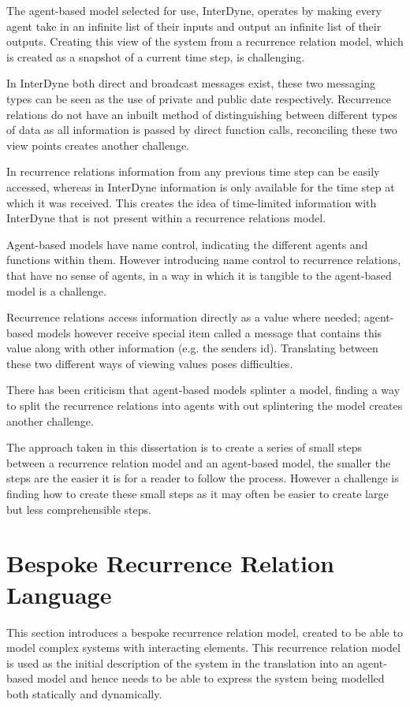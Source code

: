 \documentclass{article}
\begin{document}
The agent-based model selected for use, InterDyne, operates by making every agent take in an infinite list of their inputs and output an infinite list of their outputs. Creating this view of the system from a recurrence relation model, which is created as a snapshot of a current time step, is challenging. 

In InterDyne both direct and broadcast messages exist, these two messaging types can be seen as the use of private and public date respectively. Recurrence relations do not have an inbuilt method of distinguishing between different types of data as all information is passed by direct function calls, reconciling these two view points creates another challenge. 

In recurrence relations information from any previous time step can be easily accessed, whereas in InterDyne information is only available for the time step at which it was received. This creates the idea of time-limited information with InterDyne that is not present within a recurrence relations model.   

Agent-based models have name control, indicating the different agents and functions within them. However introducing name control to  recurrence relations, that have no sense of agents, in a way in which it is tangible to the agent-based model is a challenge. 

Recurrence relations access information directly as a value where needed; agent-based models however receive special item called a message that contains this value along with other information (e.g. the senders id). Translating between these two different ways of viewing values poses difficulties.  

There has been criticism that agent-based models splinter a model, finding a way to split the recurrence relations into agents with out splintering the model creates another challenge. 

The approach taken in this dissertation is to create a series of small steps between a recurrence relation model and an agent-based model, the smaller the steps are the easier it is for a reader to follow the process. However a challenge is finding how to create these small steps as it may often be easier to create large but less comprehensible steps.   








\newpage
\section{Bespoke Recurrence Relation Language} \label{beskoperecurrancerealtion}
This section introduces a bespoke recurrence relation model, created to be able to model complex systems with interacting elements. This recurrence relation model is used as the initial description of the system in the translation into an agent-based model and hence needs to be able to express the system being modelled both statically and dynamically. 
\end{document}
